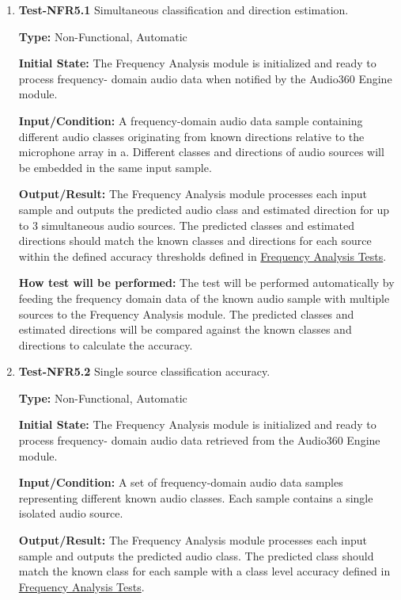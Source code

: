 \documentclass[12pt, titlepage]{article}
\begin{document}
\begin{enumerate}

\item{\textbf{Test-NFR5.1} Simultaneous classification and direction estimation.\\}

\textbf{Type:} Non-Functional, Automatic

\textbf{Initial State:}
The Frequency Analysis module is initialized and ready to process frequency-
domain audio data when notified by the Audio360 Engine module.

\textbf{Input/Condition:}
A frequency-domain audio data sample containing different audio
classes originating from known directions relative to the microphone array in a.
Different classes and directions of audio sources will be embedded in the same
input sample.

\textbf{Output/Result:}
The Frequency Analysis module processes each input sample and outputs
the predicted audio class and estimated direction for up to 3 simultaneous audio
sources. The predicted classes and estimated directions should match the known
classes and directions for each source within the defined accuracy thresholds
defined in \hyperref[sec:freq-analysis-tests]{Frequency Analysis Tests}.

\textbf{How test will be performed:}
The test will be performed automatically by feeding the frequency
domain data of the known audio sample with multiple sources to the Frequency
Analysis module. The predicted classes and estimated directions will be
compared against the known classes and directions to calculate the accuracy.

\item{\textbf{Test-NFR5.2} Single source classification accuracy.\\}
 
\textbf{Type:} Non-Functional, Automatic

\textbf{Initial State:}
The Frequency Analysis module is initialized and ready to process frequency-
domain audio data retrieved from the Audio360 Engine module.

\textbf{Input/Condition:}
A set of frequency-domain audio data samples representing different known audio
classes. Each sample contains a single isolated audio source.

\textbf{Output/Result:}
The Frequency Analysis module processes each input sample and outputs the
predicted audio class. The predicted class should match the known class for
each sample with a class level accuracy defined in 
\hyperref[sec:freq-analysis-tests]{Frequency Analysis Tests}.


\end{enumerate}
\end{document}
